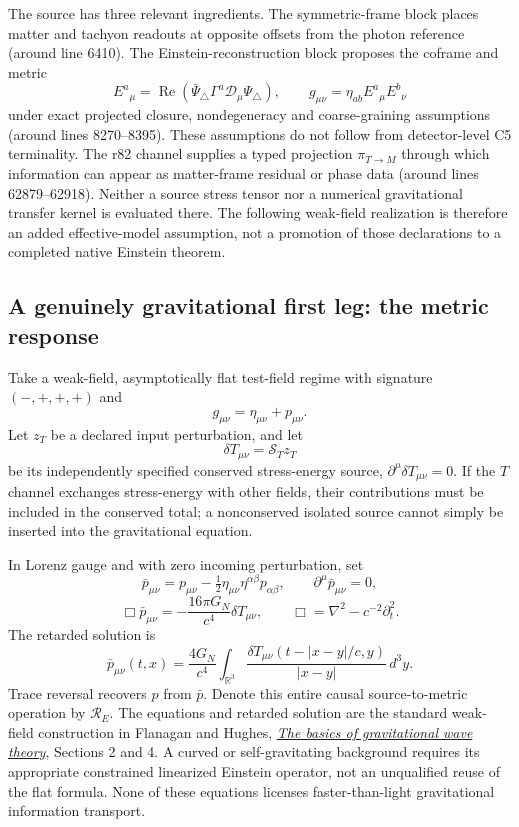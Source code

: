 \documentclass[11pt,a4paper]{article}
\begin{document}
The source has three relevant ingredients. The symmetric-frame block
places matter and tachyon readouts at opposite offsets from the photon
reference (around line 6410). The Einstein-reconstruction block proposes
the coframe and metric
\[
 E^a{}_{\mu}=\operatorname{Re}
 (\bar\Psi_\triangle\Gamma^a\mathcal D_\mu\Psi_\triangle),
 \qquad g_{\mu\nu}=\eta_{ab}E^a{}_{\mu}E^b{}_{\nu}
\]
under exact projected closure, nondegeneracy and coarse-graining
assumptions (around lines 8270--8395). These assumptions do not follow
from detector-level C5 terminality. The r82 channel supplies a typed
projection $\pi_{T\to M}$ through which information can appear as
matter-frame residual or phase data (around lines 62879--62918).
Neither a source stress tensor nor a numerical gravitational transfer
kernel is evaluated there. The following weak-field realization is
therefore an added effective-model assumption, not a promotion of
those declarations to a completed native Einstein theorem.

\subsection{A genuinely gravitational first leg: the metric response}
Take a weak-field, asymptotically flat test-field regime with
signature $(-,+,+,+)$ and
\[
 g_{\mu\nu}=\eta_{\mu\nu}+p_{\mu\nu}.
\]
Let $z_T$ be a declared input perturbation, and let
\[
 \delta T_{\mu\nu}=\mathcal S_T z_T
\]
be its independently specified conserved stress-energy source,
$\partial^\mu\delta T_{\mu\nu}=0$. If the $T$ channel exchanges
stress-energy with other fields, their contributions must be included
in the conserved total; a nonconserved isolated source cannot simply
be inserted into the gravitational equation.

In Lorenz gauge and with zero incoming perturbation, set
\[
 \bar p_{\mu\nu}=p_{\mu\nu}
 -\tfrac12\eta_{\mu\nu}\eta^{\alpha\beta}p_{\alpha\beta},
 \qquad\partial^\mu\bar p_{\mu\nu}=0,
\]
\[
 \Box\bar p_{\mu\nu}
 =-\frac{16\pi G_N}{c^4}\delta T_{\mu\nu},
 \qquad \Box=\nabla^2-c^{-2}\partial_t^2.
\]
The retarded solution is
\[
 \bar p_{\mu\nu}(t,x)
 =\frac{4G_N}{c^4}\int_{\mathbb R^3}
 \frac{\delta T_{\mu\nu}(t-|x-y|/c,y)}{|x-y|}\,d^3y.
\]
Trace reversal recovers $p$ from $\bar p$. Denote this entire causal
source-to-metric operation by $\mathcal R_E$.
The equations and retarded solution are the standard weak-field
construction in Flanagan and Hughes,
\href{https://arxiv.org/abs/gr-qc/0501041}{\emph{The basics of gravitational wave theory}},
Sections 2 and 4. A curved or self-gravitating background requires
its appropriate constrained linearized Einstein operator, not an
unqualified reuse of the flat formula. None of these equations
licenses faster-than-light gravitational information transport.
\end{document}
